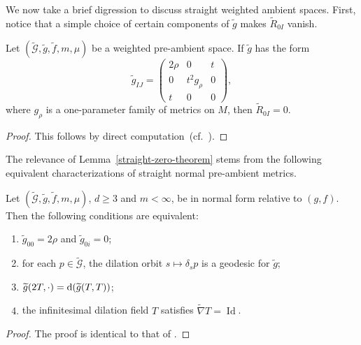 We now take a brief digression to discuss straight weighted ambient spaces. First, notice that a simple choice of certain components of $\widetilde{g}$ makes $\widetilde{R}_{0I}$ vanish.

\begin{Lemma}
\label{straight-zero-theorem}
Let $(\widetilde{\mathcal{G}},\widetilde{g},\widetilde{f},m,\mu)$ be a weighted pre-ambient space. If $\widetilde{g}$ has the form
\begin{equation}
\label{straightmetric}
 \widetilde{g}_{IJ}=\begin{pmatrix} 2\rho&0&t\\0& t^2 g_{\rho}&0\\t&0&0 \end{pmatrix}\!,
\end{equation}
where $g_\rho$ is a one-parameter family of metrics on $M$, then $\widetilde{R}_{0I}=0$.
\end{Lemma}

\begin{proof}This follows by direct computation~(cf.\ \cite[Lemma 3.2]{FeffermanGraham2012}).
\end{proof}

The relevance of Lemma~\ref{straight-zero-theorem} stems from the following equivalent characterizations of straight normal pre-ambient metrics.
\begin{Proposition}
\label{straightproperties}
Let $(\widetilde{\mathcal{G}},\widetilde{g},\widetilde{f},m,\mu)$, $d\geq 3$ and $m<\infty$, be in normal form relative to $(g,f)$. Then the following conditions are equivalent:
\begin{enumerate}[label=$(\roman*)$]\itemsep=0pt
\item $\widetilde{g}_{00}=2\rho$ and $\widetilde{g}_{0i}=0$;

\item for each $p\in \widetilde{\mathcal{G}}$, the dilation orbit $s\mapsto \delta_s p$ is a geodesic for $\widetilde{g}$;

\item $\widetilde{g}(2T,\cdot)={\rm d}(\widetilde{g}(T,T))$;

\item the infinitesimal dilation field $T$ satisfies $\widetilde{\nabla}T=\operatorname{Id}$.
\end{enumerate}
\end{Proposition}

\begin{proof}
The proof is identical to that of \cite[Proposition 3.4]{FeffermanGraham2012}.
\end{proof}

